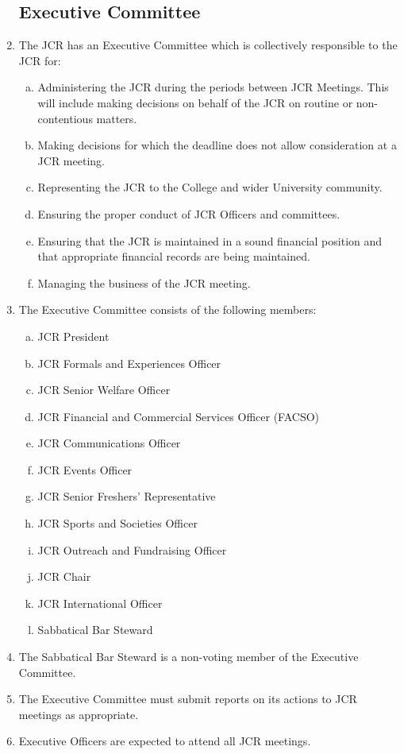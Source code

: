 \documentclass[12pt]{article}
\begin{document}
\begin{enumerate}
    \subsection{Executive Committee}
    \item The JCR has an Executive Committee which is collectively responsible to the JCR for:
    \begin{enumerate}[(a)]
        \item Administering the JCR during the periods between JCR Meetings. This will include making decisions on behalf of the JCR on routine or non-contentious matters.
        \item Making decisions for which the deadline does not allow consideration at a JCR meeting.
        \item Representing the JCR to the College and wider University community.
        \item Ensuring the proper conduct of JCR Officers and committees.
        \item Ensuring that the JCR is maintained in a sound financial position and that appropriate financial records are being maintained.
        \item Managing the business of the JCR meeting.
    \end{enumerate}
    \item The Executive Committee consists of the following members:
    \begin{enumerate}[(a)]
        \item JCR President
        \item JCR Formals and Experiences Officer
        \item JCR Senior Welfare Officer
        \item JCR Financial and Commercial Services Officer (FACSO)
        \item JCR Communications Officer
        \item JCR Events Officer
        \item JCR Senior Freshers’ Representative
        \item JCR Sports and Societies Officer
        \item JCR Outreach and Fundraising Officer
        \item JCR Chair
        \item JCR International Officer
        \item Sabbatical Bar Steward
    \end{enumerate}
    \item The Sabbatical Bar Steward is a non-voting member of the Executive Committee.
    \item The Executive Committee must submit reports on its actions to JCR meetings as appropriate.
    \item Executive Officers are expected to attend all JCR meetings.


\end{enumerate}
\end{document}
